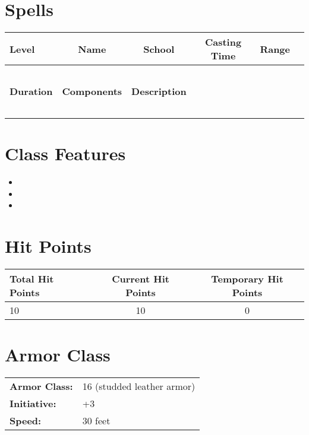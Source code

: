 \documentclass[12pt]{article}
\begin{document}
\section{Spells}
\begin{tabularx}{\linewidth}{lcccc}
\toprule
\textbf{Level} & \textbf{Name} & \textbf{School} & \textbf{Casting Time} & \textbf{Range} \\
\midrule
 &  &  &  &  \\
 &  &  &  &  \\
 &  &  &  &  \\
 &  &  &  &  \\
 &  &  &  &  \\

\textbf{Duration} & \textbf{Components} & \textbf{Description} \\
\midrule
 &  &  &  &  &  &  \\
 &  &  &  &  &  &  \\
 &  &  &  &  &  &  \\
 &  &  &  &  &  &  \\
 &  &  &  &  &  &  \\
\bottomrule
\end{tabularx}

\section{Class Features}
\begin{itemize}[leftmargin=*]
\item 
\item 
\item 
\end{itemize}

\section{Hit Points}
\begin{tabularx}{\linewidth}{lcc}
\toprule
\textbf{Total Hit Points} & \textbf{Current Hit Points} & \textbf{Temporary Hit Points} \\
\midrule
10 & 10 & 0 \\
\bottomrule
\end{tabularx}

\section{Armor Class}
\begin{tabularx}{\linewidth}{lX}
\textbf{Armor Class:} & 16 (studded leather armor) \\
\textbf{Initiative:} & +3 \\
\textbf{Speed:} & 30 feet \\
\end{tabularx}
\end{document}
